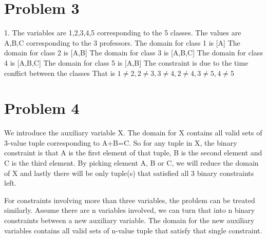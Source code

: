 \documentclass[11pt]{article}
\begin{document}
\section*{Problem 3}

1. \newline
The variables are 1,2,3,4,5 corresponding to the 5 classes.\newline
The values are A,B,C corresponding to the 3 professors.\newline
The domain for class 1 is [A] \newline
The domain for class 2 is [A,B] \newline
The domain for class 3 is [A,B,C] \newline
The domain for class 4 is [A,B,C] \newline
The domain for class 5 is [A,B] \newline
The constraint is due to the time conflict between the classes \newline
That is  $1\neq 2, 2\neq3, 3\neq4, 2\neq4, 3\neq5, 4\neq5$ \newline
\newline
\newline
\newline
\newline
\newline
\newline


\section*{Problem 4}
We introduce the auxiliary variable X. The domain for X contains all valid sets of 3-value tuple corresponding to A+B=C. So for any tuple in X, the binary constraint is that A is the first element of that tuple, B is the second element and C is the third element. By picking element A, B or C, we will reduce the domain of X and lastly there will be only tuple(s) that satisfied all 3 binary constraints left. \newline

\noindent For constraints involving more than three variables, the problem can be treated similarly. Assume there are n variables involved, we can turn that into n binary constraints between a new auxiliary variable. The domain for the new auxiliary variables contains all valid sets of n-value tuple that satisfy that single constraint.\newline


 
\end{document}
